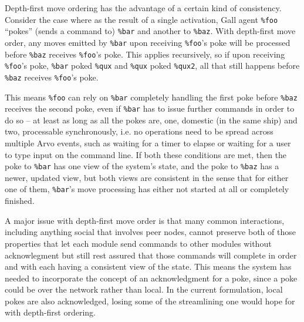 \documentclass[twoside]{article}
\begin{document}
Depth-first move ordering has the advantage of a certain kind of consistency.  Consider the case where as the result of a single activation, Gall agent \lstinline[style=inlinecode]{%foo} ``pokes'' (sends a command to) \lstinline[style=inlinecode]{%bar} and another to \lstinline[style=inlinecode]{%baz}.  With depth-first move order, any moves emitted by \lstinline[style=inlinecode]{%bar} upon receiving \lstinline[style=inlinecode]{%foo}'s poke will be processed before \lstinline[style=inlinecode]{%baz} receives \lstinline[style=inlinecode]{%foo}'s poke.  This applies recursively, so if upon receiving \lstinline[style=inlinecode]{%foo}'s poke, \lstinline[style=inlinecode]{%bar} poked \lstinline[style=inlinecode]{%qux} and \lstinline[style=inlinecode]{%qux} poked \lstinline[style=inlinecode]{%qux2}, all that still happens before \lstinline[style=inlinecode]{%baz} receives \lstinline[style=inlinecode]{%foo}'s poke.

This means \lstinline[style=inlinecode]{%foo} can rely on \lstinline[style=inlinecode]{%bar} completely handling the first poke before \lstinline[style=inlinecode]{%baz} receives the second poke, even if \lstinline[style=inlinecode]{%bar} has to issue further commands in order to do so – at least as long as all the pokes are, one, domestic (in the same ship) and two, processable synchronously, i.e. no operations need to be spread across multiple Arvo events, such as waiting for a timer to elapse or waiting for a user to type input on the command line.  If both these conditions are met, then the poke to \lstinline[style=inlinecode]{%bar} has one view of the system's state, and the poke to \lstinline[style=inlinecode]{%baz} has a newer, updated view, but both views are consistent in the sense that for either one of them, \lstinline[style=inlinecode]{%bar}'s move processing has either not started at all or completely finished.

A major issue with depth-first move order is that many common interactions, including anything social that involves peer nodes, cannot preserve both of those properties that let each module send commands to other modules without acknowlegment but still rest assured that those commands will complete in order and with each having a consistent view of the state.  This means the system has needed to incorporate the concept of an acknowledgment for a poke, since a poke could be over the network rather than local.  In the current formulation, local pokes are also acknowledged, losing some of the streamlining one would hope for with depth-first ordering.
\end{document}
